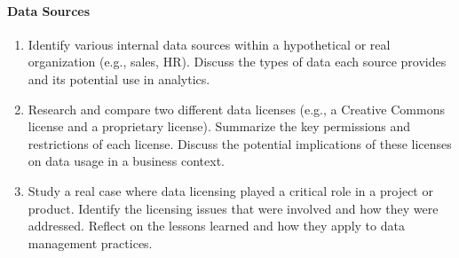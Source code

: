 \paragraph*{Data Sources}
\begin{enumerate}
    \item Identify various internal data sources within a hypothetical or real organization (e.g., sales, HR). Discuss the types of data each source provides and its potential use in analytics.
    \item Research and compare two different data licenses (e.g., a Creative Commons license and a proprietary license). Summarize the key permissions and restrictions of each license. Discuss the potential implications of these licenses on data usage in a business context.
    \item Study a real case where data licensing played a critical role in a project or product. Identify the licensing issues that were involved and how they were addressed. Reflect on the lessons learned and how they apply to data management practices.
\end{enumerate}

